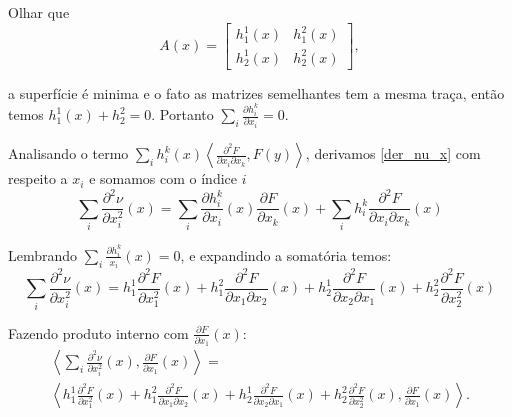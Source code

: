 \begin{demonstracao}
	Olhar que 
	\begin{equation*}
		A(x) = \left[\begin{matrix}
		h_1^1(x) & h_1^2(x)\\
		h_2^1(x) & h_2^2(x)
		\end{matrix}\right],
	\end{equation*}
	
	a superfície é minima e o fato as matrizes semelhantes tem a mesma traça, então temos $h_1^1(x) + h_2^2 = 0$. Portanto $\sum_i \frac{\partial h_i^k}{\partial x_i} = 0$.
	
	Analisando o termo $\sum_i h_i^k(x) \left\langle \frac{\partial^2 F}{\partial x_i \partial x_k}, F(y) \right\rangle$, derivamos \ref{der_nu_x} com respeito a $x_i$ e somamos com o índice $i$
	\begin{equation*}
		\sum_i \frac{\partial^2 \nu}{\partial x_i^2}(x) = \sum_i \frac{\partial h_i^k}{\partial x_i}(x) \frac{\partial F}{\partial x_k}(x) + \sum_i h_i^k \frac{\partial^2 F}{\partial x_i \partial x_k}(x)
	\end{equation*}
	
	Lembrando $\sum_i \frac{\partial h_i^k}{x_i}(x) = 0$, e expandindo a somatória  temos:
	\begin{equation*}
		\sum_i \frac{\partial^2 \nu}{\partial x_i^2}(x) =  h_1^1 \frac{\partial^2 F}{\partial x_1^2}(x) + h_1^2 \frac{\partial^2 F}{\partial x_1 \partial x_2}(x) + h_2^1 \frac{\partial^2 F}{\partial x_2 \partial x_1}(x) + h_2^2 \frac{\partial^2 F}{\partial x_2^2}(x)
	\end{equation*}
	
	Fazendo produto interno com $\frac{\partial F}{\partial x_1}(x)$:
	\begin{multline*}
		\left\langle \sum_i \frac{\partial^2 \nu}{\partial x_i^2}(x), \frac{\partial F}{\partial x_1}(x) \right\rangle =\\
		\left\langle h_1^1 \frac{\partial^2 F}{\partial x_1^2}(x) + h_1^2 \frac{\partial^2 F}{\partial x_1 \partial x_2}(x) + h_2^1 \frac{\partial^2 F}{\partial x_2 \partial x_1}(x) + h_2^2 \frac{\partial^2 F}{\partial x_2^2}(x), \frac{\partial F}{\partial x_1}(x) \right\rangle.
	\end{multline*}
	

\end{demonstracao}
